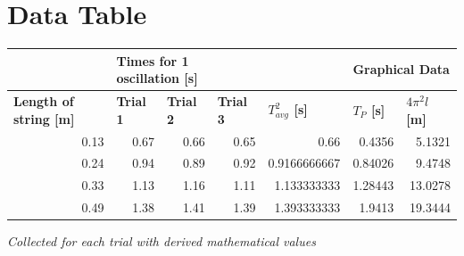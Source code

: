 \documentclass[11pt,letterpaper]{article}
\begin{document}
\section{Data Table}

\begin{table} [h]
\begin{tabular}{rrrrrrr}
\multicolumn{1}{l}{\textbf{}}                       & \multicolumn{3}{l}{\textbf{Times for 1 oscillation [s]}}                                                                & \multicolumn{1}{l}{\textbf{}}                    & \multicolumn{2}{l}{\textbf{Graphical Data}}                                              \\ \hline
\multicolumn{1}{|l|}{\textbf{Length of string [m]}} & \multicolumn{1}{l|}{\textbf{Trial 1}} & \multicolumn{1}{l|}{\textbf{Trial 2}} & \multicolumn{1}{l|}{\textbf{Trial 3}} & \multicolumn{1}{l|}{\textbf{$T_{avg}^2$ [s]}} & \multicolumn{1}{l|}{\textbf{$T_{P}$ [s]}} & \multicolumn{1}{l|}{\textbf{$4 \pi^2l$ [m]}} \\ \hline
\multicolumn{1}{|r|}{0.13}                          & \multicolumn{1}{r|}{0.67}             & \multicolumn{1}{r|}{0.66}             & \multicolumn{1}{r|}{0.65}             & \multicolumn{1}{r|}{0.66}                        & \multicolumn{1}{r|}{0.4356}      & \multicolumn{1}{r|}{5.1321}                           \\ \hline
\multicolumn{1}{|r|}{0.24}                          & \multicolumn{1}{r|}{0.94}             & \multicolumn{1}{r|}{0.89}             & \multicolumn{1}{r|}{0.92}             & \multicolumn{1}{r|}{0.9166666667}                & \multicolumn{1}{r|}{0.84026}     & \multicolumn{1}{r|}{9.4748}                           \\ \hline
\multicolumn{1}{|r|}{0.33}                          & \multicolumn{1}{r|}{1.13}             & \multicolumn{1}{r|}{1.16}             & \multicolumn{1}{r|}{1.11}             & \multicolumn{1}{r|}{1.133333333}                 & \multicolumn{1}{r|}{1.28443}     & \multicolumn{1}{r|}{13.0278}                          \\ \hline
\multicolumn{1}{|r|}{0.49}                          & \multicolumn{1}{r|}{1.38}             & \multicolumn{1}{r|}{1.41}             & \multicolumn{1}{r|}{1.39}             & \multicolumn{1}{r|}{1.393333333}                 & \multicolumn{1}{r|}{1.9413}      & \multicolumn{1}{r|}{19.3444}                          \\ \hline
\end{tabular}
\end{table}
\textit{Collected for each trial with derived mathematical values}
\end{document}
